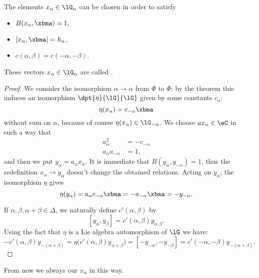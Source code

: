 \begin{corollary}
The elements $ x_{\alpha}\in\lG_{\alpha}$ can be chosen in order to satisfy

\begin{itemize}
\item $B( x_{\alpha},\xbma)=1,$
\item $[ x_{\alpha},\xbma]= h_{\alpha}$,
\item $c(\alpha,\beta)=c(-\alpha,-\beta)$.
\end{itemize}

\end{corollary}

These vectors $ x_{\alpha}\in\lG_{\alpha}$ are called .

\begin{proof}
We consider the isomorphism $\alpha\to\alpha$ from $\Phi$ to $\Phi$; by the theorem this induces an isomorphism $\dpt{\eta}{\lG}{\lG}$ given by some constants $c_{\alpha}$:
\[
\eta( x_{\alpha})=c_{-\alpha}\xbma
\]
without sum on $\alpha$, because of course $\eta( x_{\alpha})\in\lG_{-\alpha}$. We choose $a x_{\alpha}\in\eC$ in such a way that
\begin{subequations}
\begin{align}
a_{\alpha}^2&=-c_{-\alpha}\\
a_{\alpha} a_{-\alpha}&=1,
\end{align} 
\end{subequations} 
and then we put $y_{\alpha}=a_{\alpha} x_{\alpha}$. It is immediate that $B(y_{\alpha},y_{-\alpha})=1$, thus the redefinition $ x_{\alpha}\to y_{\alpha}$ doesn't change the obtained relations. Acting on $y_{\alpha}$, the isomorphism $\eta$ gives
\begin{equation}
\eta(y_{\alpha})=a_{\alpha} c_{-\alpha}\xbma
=-a_{-\alpha}\xbma
=-y_{-\alpha}.
\end{equation}

If $\alpha,\beta,\alpha+\beta\in\Delta$, we naturally define $c'(\alpha,\beta)$ by
\[
[y_{\alpha},y_{\beta}]=c'(\alpha,\beta)y_{\alpha,\beta}.
\]
Using the fact that $\eta$ is a Lie algebra automorphism of $\lG$ we have:
\begin{equation}
-c'(\alpha,\beta)y_{-(\alpha+\beta)}=\eta\big(  c'(\alpha,\beta)y_{\alpha+\beta}   \big)
            =[-y_{-\alpha},-y_{-\beta}]
            =c'(-\alpha,-\beta)y_{-(\alpha+\beta)}.
\end{equation}
\end{proof}

From now we always our $ x_{\alpha}$ in this way.

